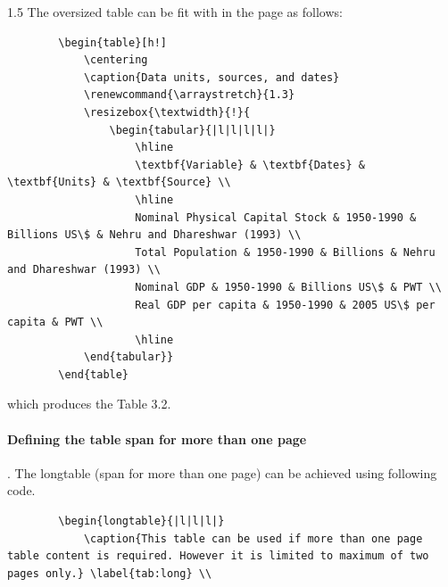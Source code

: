 \begin{spacing}{1.5}
The oversized table can be fit with in the page as follows: 
{\scriptsize
	\begin{verbatim}
		\begin{table}[h!]
			\centering
			\caption{Data units, sources, and dates}
			\renewcommand{\arraystretch}{1.3}
			\resizebox{\textwidth}{!}{
				\begin{tabular}{|l|l|l|l|}
					\hline
					\textbf{Variable} & \textbf{Dates} & \textbf{Units} & \textbf{Source} \\
					\hline
					Nominal Physical Capital Stock & 1950-1990 & Billions US\$ & Nehru and Dhareshwar (1993) \\
					Total Population & 1950-1990 & Billions & Nehru and Dhareshwar (1993) \\
					Nominal GDP & 1950-1990 & Billions US\$ & PWT \\
					Real GDP per capita & 1950-1990 & 2005 US\$ per capita & PWT \\
					\hline
			\end{tabular}}
		\end{table}
	\end{verbatim}
}
which produces the Table 3.2.

\begin{table}[h]
\centering
\caption{Data units, sources, and dates}
\renewcommand{\arraystretch}{1.3}
\end{table}

\paragraph{Defining the table span for more than one page}. 
The longtable (span for more than one page) can be achieved using following code. 
{\scriptsize
	\begin{verbatim}
		\begin{longtable}{|l|l|l|}
			\caption{This table can be used if more than one page table content is required. However it is limited to maximum of two pages only.} \label{tab:long} \\
			

\end{verbatim}}
\end{spacing}
